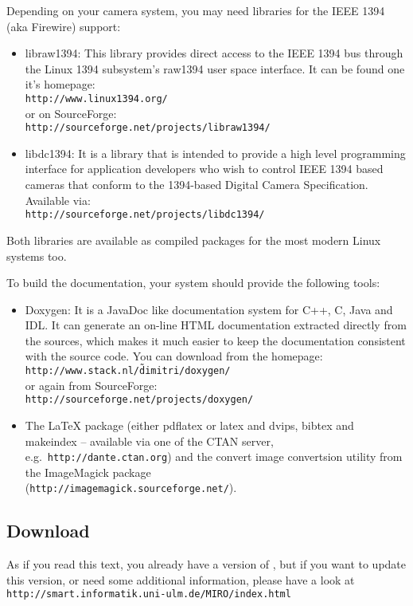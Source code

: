 Depending on your camera system, you may need libraries for the
IEEE 1394 (aka Firewire) support:
\begin{itemize} 
\item libraw1394: This library provides direct access to the IEEE 1394
  bus through the Linux 1394 subsystem's raw1394 user space
  interface. It can be found one it's homepage:\\
  \texttt{http://www.linux1394.org/}\\
  or on SourceForge:\\
  \texttt{http://sourceforge.net/projects/libraw1394/}
\item libdc1394: It is a library that is intended to provide a high
  level programming interface for application developers who wish to
  control IEEE 1394 based cameras that conform to the 1394-based
  Digital Camera Specification. Available via:\\
  \texttt{http://sourceforge.net/projects/libdc1394/}
\end{itemize}
Both libraries are available as compiled packages for the most modern
Linux systems too.

To build the documentation, your system should provide the following
tools:
\begin{itemize}
\item Doxygen: It is a JavaDoc like documentation system for C++, C,
  Java and IDL. It can generate an on-line HTML documentation
  extracted directly from the sources, which makes it much easier to
  keep the documentation consistent with the source code. You can
  download from the homepage:
  \texttt{http://www.stack.nl/\~dimitri/doxygen/}\\
  or again from SourceForge:\\
  \texttt{http://sourceforge.net/projects/doxygen/}
\item The LaTeX package (either pdflatex or latex and dvips, bibtex
  and makeindex -- available via one of the CTAN server, e.g.\ 
  \texttt{http://dante.ctan.org}) and the convert image convertsion
  utility from the ImageMagick package \\
  (\texttt{http://imagemagick.sourceforge.net/}).
\end{itemize}

\subsection{Download}

As if you read this text, you already have a version of \miro, but if
you want to update this version, or need some additional information,
please have a look at
\texttt{http://smart.informatik.uni-ulm.de/MIRO/index.html}

